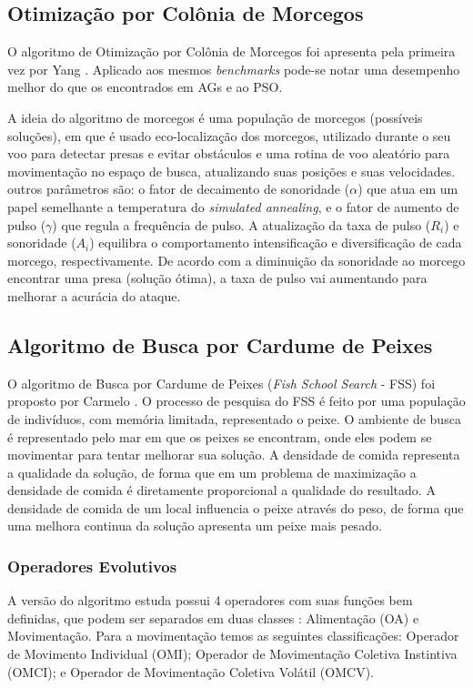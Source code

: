 \subsection{Otimização por Colônia de Morcegos}
\label{sec:bat_algorithm}
O algoritmo de Otimização por Colônia de Morcegos foi apresenta pela primeira vez por Yang \cite{bat}. Aplicado aos mesmos \textit{benchmarks} pode-se notar uma desempenho melhor do que os encontrados em AGs e ao PSO. 

A ideia do algoritmo de morcegos é uma população de morcegos (possíveis soluções), em que é usado eco-localização dos morcegos, utilizado durante o seu voo para detectar presas e evitar obstáculos e uma rotina de voo aleatório para movimentação no espaço de busca, atualizando suas posições e suas velocidades. outros parâmetros são: o fator de decaimento de sonoridade ($\alpha$) que atua em um papel semelhante a temperatura do \textit{simulated annealing}, e o fator de aumento de pulso ($\gamma$) que regula a frequência de pulso. A atualização da taxa de pulso ($R_i$) e sonoridade ($A_i$) equilibra o comportamento intensificação e diversificação de cada morcego, respectivamente. De acordo com a diminuição da sonoridade ao morcego encontrar uma presa (solução ótima), a taxa de pulso vai aumentando para melhorar a acurácia do ataque. 

\subsection{Algoritmo de Busca por Cardume de Peixes}
\label{sec:fish_school_search}
O algoritmo de Busca por Cardume de Peixes (\textit{Fish School Search} - FSS) foi proposto por Carmelo \cite{carmelo2008novel}. O processo de pesquisa do FSS é feito por uma população de indivíduos, com memória limitada, representado o peixe. O ambiente de busca é representado pelo mar em que os peixes se encontram, onde eles podem se movimentar para tentar melhorar sua solução. A densidade de comida representa a qualidade da solução, de forma que em um problema de maximização a densidade de comida é diretamente proporcional a qualidade do resultado. A densidade de comida de um local influencia o peixe através do peso, de forma que uma melhora continua da solução apresenta um peixe mais pesado.

\subsubsection{Operadores Evolutivos}
\label{sec:evolutionary_operators}
A versão do algoritmo estuda possui 4 operadores com suas funções bem definidas, que podem ser separados em duas classes \cite{c2009influence}: Alimentação (OA) e Movimentação. Para a movimentação temos as seguintes classificações: Operador de Movimento Individual (OMI); Operador de Movimentação Coletiva Instintiva (OMCI); e Operador de Movimentação Coletiva Volátil (OMCV).


